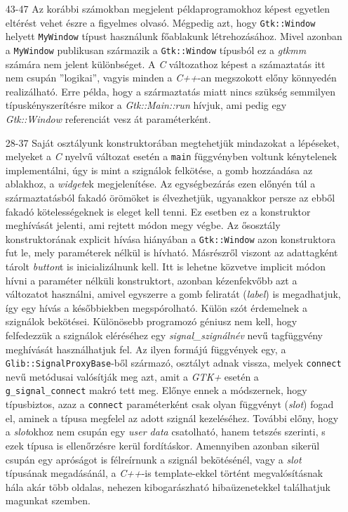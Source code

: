 \documentclass[a4paper,10pt]{article}
\begin{document}
\begin{enumerate}
 \item[43-47] Az korábbi számokban megjelent példaprogramokhoz képest egyetlen eltérést vehet észre a figyelmes olvasó. Mégpedig azt, hogy \texttt{Gtk::Window} helyett \texttt{MyWindow} típust használunk főablakunk létrehozásához. Mivel azonban a \texttt{MyWindow} publikusan származik a \texttt{Gtk::Window} típusból ez a \textit{gtkmm } számára nem jelent különbséget. A \textit{C} változathoz képest a számaztatás itt nem csupán ''logikai'', vagyis minden a \textit{C++}-an megszokott előny könnyedén realizálható. Erre példa, hogy a származtatás miatt nincs szükség semmilyen típuskényszerítésre mikor a \textit{Gtk::Main::run} hívjuk, ami pedig egy \textit{Gtk::Window} referenciát vesz át paraméterként.

 \item[28-37] Saját osztályunk konstruktorában megtehetjük mindazokat a lépéseket, melyeket a \textit{C} nyelvű változat esetén a \texttt{main} függvényben voltunk kénytelenek implementálni, úgy is mint a szignálok felkötése, a gomb hozzáadása az ablakhoz, a \textit{widget}ek megjelenítése. Az egységbezárás ezen előnyén túl a származtatásból fakadó örömöket is élvezhetjük, ugyanakkor persze az ebből fakadó kötelességeknek is eleget kell tenni. Ez esetben ez a konstruktor meghívását jelenti, ami rejtett módon megy végbe. Az ősosztály konstruktorának explicit hívása hiányában a \texttt{Gtk::Window} azon konstruktora fut le, mely paraméterek nélkül is hívható. Másrészről viszont az adattagként tárolt \textit{button}t is inicializálnunk kell. Itt is lehetne közvetve implicit módon hívni a paraméter nélküli konstruktort, azonban kézenfekvőbb azt a változatot használni, amivel egyszerre a gomb feliratát (\textit{label}) is megadhatjuk, így egy hívás a későbbiekben megspórolható. Külön szót érdemelnek a szignálok bekötései. Különösebb programozó géniusz nem kell, hogy felfedezzük a szignálok eléréséhez egy \textit{signal\_}\textit{szignálnév} nevű tagfüggvény meghívását használhatjuk fel. Az ilyen formájú függvények egy, a \texttt{Glib::SignalProxyBase}-ből származó, osztályt adnak vissza, melyek \texttt{connect} nevű metódusai valósítják meg azt, amit a \textit{GTK+} esetén a \texttt{g\_signal\_connect} makró tett meg. Előnye ennek a módszernek, hogy típusbiztos, azaz a \texttt{connect} paraméterként csak olyan függvényt (\textit{slot}) fogad el, aminek a típusa megfelel az adott szignál kezeléséhez. További előny, hogy a \textit{slot}okhoz nem csupán egy \textit{user data} csatolható, hanem tetszés szerinti, s ezek típusa is ellenőrzésre kerül fordításkor. Amennyiben azonban sikerül csupán egy apróságot is félreírnunk a szignál bekötésénél, vagy a \textit{slot} típusának megadásánál, a \textit{C++}-is template-ekkel történt megvalósításnak hála akár több oldalas, nehezen kibogarászható hibaüzenetekkel találhatjuk magunkat szemben.


\end{enumerate}
\end{document}
